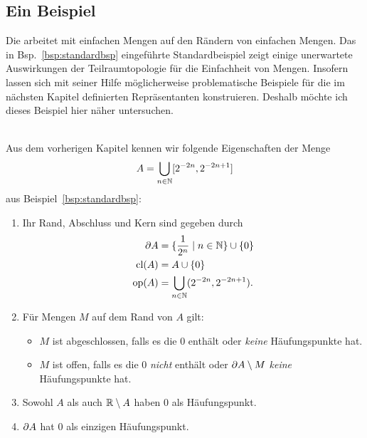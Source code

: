     \subsection{Ein Beispiel}\label{ssec:standardbsp}
    Die \strukt arbeitet mit einfachen Mengen auf den Rändern von einfachen Mengen.
    Das in Bsp.~\ref{bsp:standardbsp} eingeführte Standardbeispiel zeigt einige unerwartete Auswirkungen der Teilraumtopologie für die Einfachheit von Mengen.
    Insofern lassen sich mit seiner Hilfe möglicherweise problematische Beispiele für die im nächsten Kapitel definierten Repräsentanten konstruieren.
    Deshalb möchte ich dieses Beispiel hier näher untersuchen.
%    
    \begin{erin}\ \\
    Aus dem vorherigen Kapitel kennen wir folgende Eigenschaften der Menge %
    \begin{align*}
        A = \bigcup_{n \in \mathbb{N}} [2^{-2n}, 2^{-2n+1}]
    \end{align*}
    aus Beispiel~\ref{bsp:standardbsp}:
%
        \begin{enumerate}
            \item Ihr Rand, Abschluss und Kern sind gegeben durch
                \begin{align*}
                    \partial A &= \{\frac{1}{2^n} \mid n \in \mathbb{N}\} \cup \{0\}\\
                    \text{cl}(A) &= A \cup \{0\}\\
                    \text{op}(A) &= \bigcup_{n \in \mathbb{N}} (2^{-2n}, 2^{-2n+1}).
                \end{align*}
            \item Für Mengen $M$ auf dem Rand von $A$ gilt:
                \begin{itemize}
                    \item $M$ ist abgeschlossen, falls es die $0$ enthält oder \textit{keine} Häufungspunkte hat.
                    \item $M$ ist offen, falls es die $0$ \textit{nicht} enthält oder $\partial A \setminus M$ \textit{keine} Häufungspunkte hat.
                \end{itemize}
            \item Sowohl $A$ als auch $\mathbb{R} \setminus A$ haben $0$ als Häufungspunkt.
            \item $\partial A$ hat $0$ als einzigen Häufungspunkt.
        \end{enumerate}
    \end{erin}

